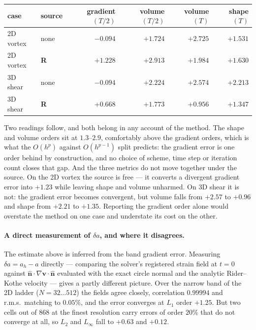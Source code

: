 \documentclass[preprint,3p,11pt]{elsarticle}
\newcommand{\nhat}{\hat{\mathbf{n}}}
\begin{document}
\begin{center}
\begin{tabular}{llrrrr}
\toprule
case & source & gradient $(T/2)$ & volume $(T/2)$ & volume $(T)$ & shape $(T)$ \\
\midrule
2D vortex & none      & $-0.094$ & $+1.724$ & $+2.725$ & $+1.531$ \\
2D vortex & \textbf{R}& $+1.228$ & $+2.913$ & $+1.984$ & $+1.630$ \\
3D shear  & none      & $-0.094$ & $+2.224$ & $+2.574$ & $+2.213$ \\
3D shear  & \textbf{R}& $+0.668$ & $+1.773$ & $+0.956$ & $+1.347$ \\
\bottomrule
\end{tabular}
\end{center}

Two readings follow, and both belong in any account of the method. The shape and
volume orders sit at $1.3$--$2.9$, comfortably above the gradient orders, which
is what the $O(h^p)$ against $O(h^{p-1})$ split predicts: the gradient error is
one order behind by construction, and no choice of scheme, time step or
iteration count closes that gap. And the three metrics do not move together
under the source. On the 2D vortex the source is free --- it converts a
divergent gradient error into $+1.23$ while leaving shape and volume unharmed.
On 3D shear it is not: the gradient error becomes convergent, but volume falls
from $+2.57$ to $+0.96$ and shape from $+2.21$ to $+1.35$. Reporting the
gradient order alone would overstate the method on one case and understate its
cost on the other.

\paragraph{A direct measurement of $\delta a$, and where it disagrees.}
The estimate above is inferred from the band gradient error. Measuring
$\delta a = a_h - a$ directly --- comparing the solver's registered strain field
at $t=0$ against $\nhat\cdot\nabla\mathbf{v}\cdot\nhat$ evaluated with the exact
circle normal and the analytic Rider--Kothe velocity --- gives a partly
different picture. Over the narrow band of the 2D ladder ($N=32\ldots512$) the
fields agree closely, correlation $0.99994$ and r.m.s.\ matching to $0.05\%$,
and the error converges at $L_1$ order $+1.25$. But two cells out of $868$ at
the finest resolution carry errors of order $20\%$ that do not converge at all,
so $L_2$ and $L_\infty$ fall to $+0.63$ and $+0.12$.
\end{document}
